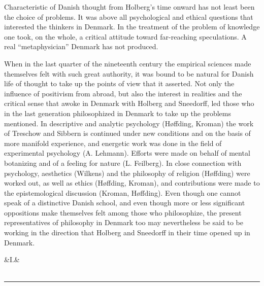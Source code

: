 \documentclass[12pt,a4paper,openany]{book}
\newcommand{\opage}[1]{\marginnote{\footnotesize\textit{[#1]}}}
\newcommand{\anthsection}[2]{\clearpage\begin{center}\ifx&#1&\else{\large #1}\\[0.6em]\fi{\Large #2}\\[0.5em]\rule{3em}{0.4pt}\end{center}\medskip}
\newenvironment{intro}{\par}{\par}
\begin{document}
\begin{intro}
Characteristic of Danish thought from Holberg's time onward has not least been
the choice of problems. It was above all psychological and ethical questions that
interested the thinkers in Denmark. In the treatment of the problem of knowledge
one took, on the whole, a critical attitude toward far-reaching speculations. A
real ``metaphysician'' Denmark has not produced.

When in the last quarter of the nineteenth century the empirical sciences made
themselves felt with such great authority, it was bound to be natural for Danish
life of thought to take up the points of view
that it asserted. Not only the influence of positivism from abroad, but also the
interest in realities and the critical sense that awoke in Denmark with Holberg
and Sneedorff, led those who in the last generation philosophized in Denmark to
take up the problems mentioned. In descriptive and analytic psychology
(Høffding, Kroman) the work of Treschow and Sibbern is continued under new
conditions and on the basis of more manifold experience, and energetic work was
done in the field of experimental psychology (A. Lehmann). Efforts were made on
behalf of mental botanizing and of a feeling for nature (L. Feilberg). In close
connection with psychology, aesthetics (Wilkens) and the philosophy of religion
(Høffding) were worked out, as well as ethics (Høffding, Kroman), and
contributions were made to the epistemological discussion (Kroman, Høffding).
Even though one cannot speak of a distinctive Danish school, and even though
more or less significant oppositions make themselves felt among those who
philosophize, the present representatives of philosophy in Denmark too may
nevertheless be said to be working in the direction that Holberg and Sneedorff
in their time opened up in Denmark.
\end{intro}

\setcounter{footnote}{0}%
\anthsection{I.} {HOLBERG AND THE EIGHTEENTH CENTURY}\opage{4}
\end{document}
